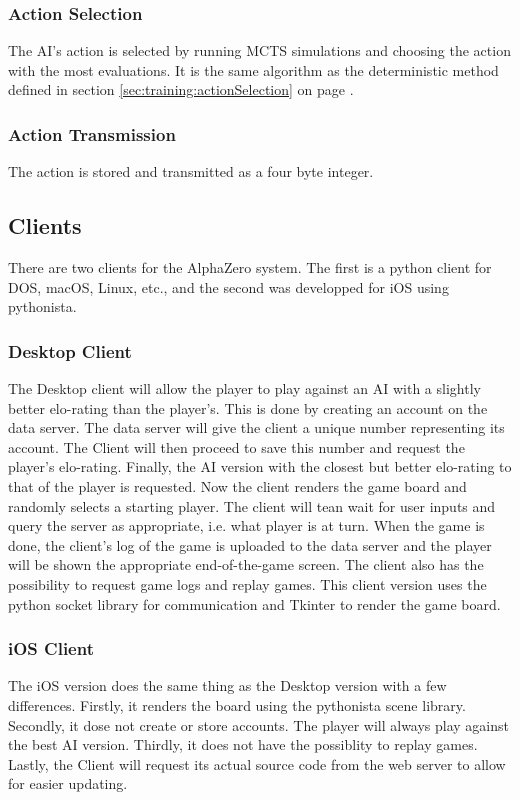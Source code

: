 \documentclass[12pt]{article}
\newcommand{\sectionref}[1]{section \ref{#1} on page \pageref{#1}}
\begin{document}
\subsubsection{Action Selection}
The AI's action is selected by running MCTS simulations and choosing the action with the most evaluations. It is the same algorithm as the deterministic method defined in \sectionref{sec:training:actionSelection}.
\subsubsection{Action Transmission}
The action is stored and transmitted as a four byte integer.

\subsection{Clients}
There are two clients for the AlphaZero system. The first is a python client for DOS, macOS, Linux, etc., and the second was developped for iOS using pythonista.
\subsubsection{Desktop Client}
The Desktop client will allow the player to play against an AI with a slightly better elo-rating than the player's. This is done by creating an account on the data server. The data server will give the client a unique number representing its account. The Client will then proceed to save this number and request the player's elo-rating. Finally, the AI version with the closest but better elo-rating to that of the player is requested. Now the client renders the game board and randomly selects a starting player. The client will tean wait for user inputs and query the server as appropriate, i.e. what player is at turn. When the game is done, the client's log of the game is uploaded to the data server and the player will be shown the appropriate end-of-the-game screen. The client also has the possibility to request game logs and replay games.
This client version uses the python socket library for communication and Tkinter to render the game board.
\subsubsection{iOS Client}\label{sec:iosClient}
The iOS version does the same thing as the Desktop version with a few differences. Firstly, it renders the board using the pythonista scene library. Secondly, it dose not create or store accounts. The player will always play against the best AI version. Thirdly, it does not have the possiblity to replay games. Lastly, the Client will request its actual source code from the web server to allow for easier updating.
\end{document}
